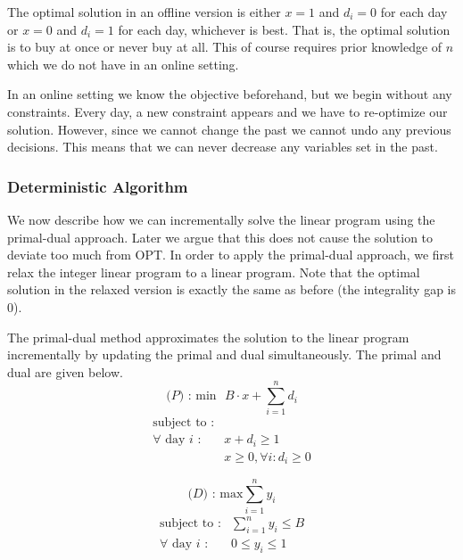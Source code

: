 The optimal solution in an offline version is either $x=1$ and $d_i = 0$ for each day or $x=0$ and $d_i = 1$ for each day, whichever is best.
That is, the optimal solution is to buy at once or never buy at all.
This of course requires prior knowledge of $n$ which we do not have in an online setting.

In an online setting we know the objective beforehand, but we begin without any constraints.
Every day, a new constraint appears and we have to re-optimize our solution.
However, since we cannot change the past we cannot undo any previous decisions.
This means that we can never decrease any variables set in the past.

\subsubsection{Deterministic Algorithm}

We now describe how we can incrementally solve the linear program using the primal-dual approach.
Later we argue that this does not cause the solution to deviate too much from OPT.
In order to apply the primal-dual approach, we first relax the integer linear program to a linear program. Note that the optimal solution in the relaxed version is exactly the same as before (the integrality gap is $0$).

The primal-dual method approximates the solution to the linear program incrementally by updating the primal and dual simultaneously.
The primal and dual are given below.
\[
\textrm{($P$) : min} \textrm{ } B\cdot x + \sum^n_{i=1} d_i
\]
\[
	\begin{array}{lr}
	\textrm{subject to :} & \\
	\textrm{$\forall$ day $i$} \textrm{ :} & x + d_i  \ge 1  \\
			    & x     \geq 0, \forall i : d_i \ge 0

	\end{array}
\]

\vspace{0.4cm}

\[
\textrm{($D$) : max} \sum^n_{i=1} y_i
\]
\[
	\begin{array}{lr}
	\textrm{subject to :} & \sum^n_{i=1} y_i \le B \\
		\textrm{$\forall$ day $i$} \textrm{ :} & 0 \le y_i  \le 1 \\
	\end{array}
\]



